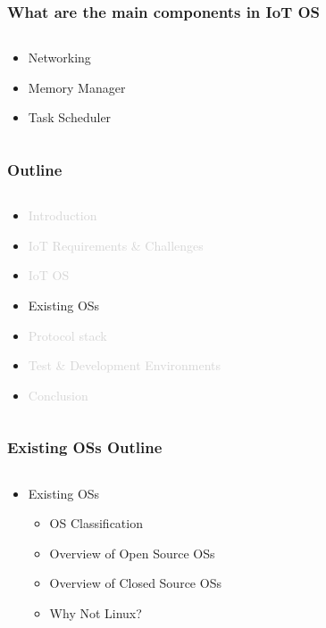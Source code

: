 \documentclass{beamer}
\begin{document}
\begin{frame}
	\frametitle{What are the main components in IoT OS}
	\begin{columns}[c]
		\begin{column}{30cm}
			\vspace{.1cm}
			\begin{itemize}
				\justifying
				\item Networking
				\item Memory Manager
				\item Task Scheduler
			\end{itemize}
		\end{column}
	\end{columns}
\end{frame}

\begin{frame}
	\frametitle{Outline}
	\begin{columns}[c]
		\begin{column}{30cm}
			\vspace{.1cm}
			\begin{itemize}
				\justifying
				\item \textcolor{LightGray}{Introduction}
				\item \textcolor{LightGray}{IoT Requirements \& Challenges}
				\item \textcolor{LightGray}{IoT OS}
				\item Existing OSs
				\item \textcolor{LightGray}{Protocol stack}
				\item \textcolor{LightGray}{Test \& Development Environments}
				\item \textcolor{LightGray}{Conclusion}
			\end{itemize}
		\end{column}
	\end{columns}
\end{frame}

\begin{frame}
	\frametitle{Existing OSs Outline}
	\begin{columns}[c]
		\begin{column}{30cm}
			\vspace{.1cm}
			\begin{itemize}
				\justifying
				\item Existing OSs
				\begin{itemize}
					\item OS Classification
					\item Overview of Open Source OSs
					\item Overview of Closed Source OSs
					\item Why Not Linux?
				\end{itemize}
			\end{itemize}
		\end{column}
	\end{columns}
\end{frame}
\end{document}
